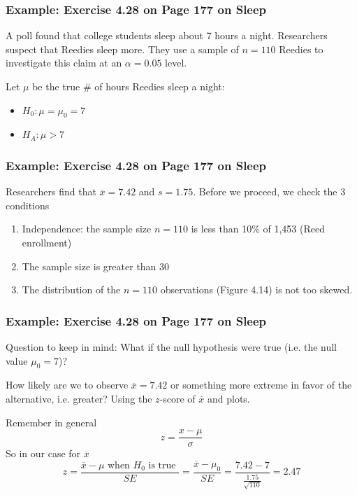 \documentclass[handout]{beamer}
\newcommand{\blue}[1]{\textcolor{blue2}{#1}}
\newcommand{\xbar}{\overline{x}}
\begin{document}
\begin{frame}
\frametitle{Example:  Exercise 4.28 on Page 177 on Sleep}
A poll found that college students sleep about 7 hours a night.  Researchers suspect that Reedies sleep more.  They use a sample of $n=110$ Reedies to investigate this claim at an $\alpha=0.05$ level.  

\vspace{0.5cm}

\pause Let $\mu$ be the true \# of hours Reedies sleep a night:

\pause \begin{itemize}
\item $H_0: \mu = \mu_0 = 7$
\item $H_A: \mu > 7$
\end{itemize}

\end{frame}


\begin{frame}
\frametitle{Example:  Exercise 4.28 on Page 177 on Sleep}
Researchers find that $\xbar = 7.42$ and $s=1.75$.  Before we proceed, we check the 3 conditions
\begin{enumerate}
\pause \item Independence: the sample size $n=110$ is less than 10\% of 1,453 (Reed enrollment)
\pause \item The sample size is greater than $30$
\pause \item The distribution of the $n=110$ observations (Figure 4.14) is not too skewed.
\end{enumerate}

\end{frame}


\begin{frame}
\frametitle{Example:  Exercise 4.28 on Page 177 on Sleep}

\blue{Question to keep in mind}:  What if the null hypothesis were true (i.e. the null value $\mu_0=7$)?

\pause \vspace{0.5cm}

How likely are we to observe $\xbar=7.42$ or something more extreme in favor of the alternative, i.e. greater?  Using the $z$-score of $\xbar$ and plots.  

\pause \vspace{0.5cm}

Remember in general
\[
z = \frac{x-\mu}{\sigma}
\]
\pause So in our case for $\xbar$
\[
z = \frac{\xbar - \mu \mbox{ when $H_0$ is true }}{SE} = \frac{\xbar - \mu_0}{SE} = \frac{7.42 - 7}{\frac{1.75}{\sqrt{110}}} = 2.47
\]

\end{frame}
\end{document}
